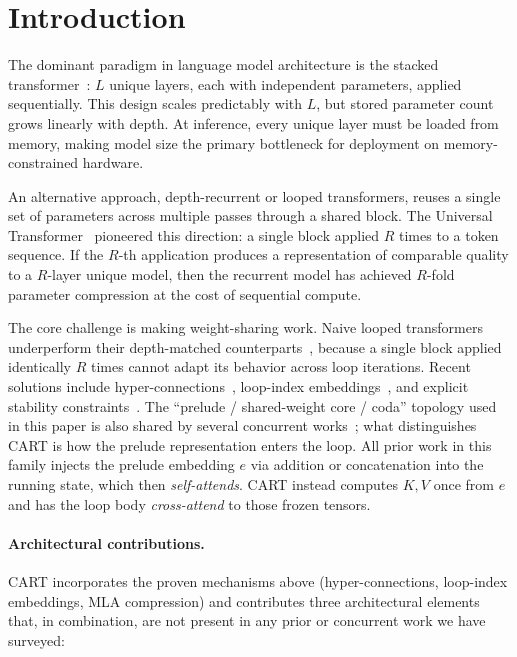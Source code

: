 \documentclass{article}
\newcommand{\cart}{\textsc{CART}}
\begin{document}
\section{Introduction}
\label{sec:intro}

The dominant paradigm in language model architecture is the stacked transformer~\citep{vaswani2017attention}: $L$ unique layers, each with independent parameters, applied sequentially. This design scales predictably with $L$, but stored parameter count grows linearly with depth. At inference, every unique layer must be loaded from memory, making model size the primary bottleneck for deployment on memory-constrained hardware.

An alternative approach, depth-recurrent or looped transformers, reuses a single set of parameters across multiple passes through a shared block. The Universal Transformer~\citep{dehghani2018universal} pioneered this direction: a single block applied $R$ times to a token sequence. If the $R$-th application produces a representation of comparable quality to a $R$-layer unique model, then the recurrent model has achieved $R$-fold parameter compression at the cost of sequential compute.

The core challenge is making weight-sharing work. Naive looped transformers underperform their depth-matched counterparts~\citep{zeitoun2026hyperloop}, because a single block applied identically $R$ times cannot adapt its behavior across loop iterations. Recent solutions include hyper-connections~\citep{zhang2024hyperconnections,zeitoun2026hyperloop,schwethelm2026isodepth}, loop-index embeddings~\citep{su2024roformer,gomez2026openmythos}, and explicit stability constraints~\citep{prairie2026parcae,gomez2026openmythos}. The ``prelude / shared-weight core / coda'' topology used in this paper is also shared by several concurrent works~\citep{geiping2025latent,prairie2026parcae,gomez2026openmythos}; what distinguishes \cart{} is how the prelude representation enters the loop. All prior work in this family injects the prelude embedding $e$ via addition or concatenation into the running state, which then \emph{self-attends}. \cart{} instead computes $K, V$ once from $e$ and has the loop body \emph{cross-attend} to those frozen tensors.

\paragraph{Architectural contributions.}
\cart{} incorporates the proven mechanisms above (hyper-connections, loop-index embeddings, MLA compression) and contributes three architectural elements that, in combination, are not present in any prior or concurrent work we have surveyed:
\end{document}
